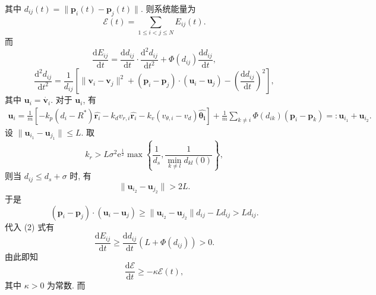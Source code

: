 \documentclass[12pt, a4paper, oneside]{ctexart}
\begin{document}
其中 $d_{ij}(t)=\|\boldsymbol{p}_i(t)-\boldsymbol{p}_j(t)\|.$ 则系统能量为
\begin{equation*}
	\mathcal{E}(t)=\sum_{1\leqslant i<j\leqslant N}E_{ij}(t).
\end{equation*}
而
\begin{equation*}
	\frac{\mathrm{d}E_{ij}}{\mathrm{d}t}=\frac{\mathrm{d}d_{ij}}{\mathrm{d}t}\cdot\frac{\mathrm{d}^2d_{ij}}{\mathrm{d}t^2}+\mathit{\Phi}(d_{ij})\frac{\mathrm{d}d_{ij}}{\mathrm{d}t},
\end{equation*}
\begin{equation}
	\frac{\mathrm{d}^2d_{ij}}{\mathrm{d}t^2}=\frac{1}{d_{ij}}\left[\|\boldsymbol{v}_i-\boldsymbol{v}_j\|^2+(\boldsymbol{p}_i-\boldsymbol{p}_j)\cdot(\boldsymbol{u}_i-\boldsymbol{u}_j)-\left(\frac{\mathrm{d}d_{ij}}{\mathrm{d}t}\right)^2\right],
\end{equation}
其中 $\boldsymbol{u}_i=\dot{\boldsymbol{v}_i}.$ 对于 $\boldsymbol{u}_i$, 有
\begin{align*}
	\boldsymbol{u}_i=\frac{1}{m}[-k_p(d_i-R^*)\widehat{\boldsymbol{r}_i}-k_dv_{r,i}\widehat{\boldsymbol{r}_i}-k_v(v_{\theta,i}-v_d)\hat{\boldsymbol{\theta_i}}]+\frac{1}{m}\sum_{k\ne i}\mathit{\Phi}(d_{ik})(\boldsymbol{p}_i-\boldsymbol{p}_k)=:\boldsymbol{u}_{i_1}+\boldsymbol{u}_{i_2}.
\end{align*}
设 $\|\boldsymbol{u}_{i_1}-\boldsymbol{u}_{j_1}\|\leqslant L.$ 取
\begin{equation*}
	k_r>L\sigma^2\mathrm{e}^{\frac{1}{2}}\max\left\{\frac{1}{d_s},\frac{1}{\displaystyle\min_{k\ne l}d_{kl}(0)}\right\},
\end{equation*}
则当 $d_{ij}\leqslant d_s+\sigma$ 时, 有
\begin{equation*}
	\|\boldsymbol{u}_{i_2}-\boldsymbol{u}_{j_2}\|>2L.
\end{equation*}
于是
\begin{equation*}
	(\boldsymbol{p}_i-\boldsymbol{p}_j)\cdot(\boldsymbol{u}_i-\boldsymbol{u}_j)\geqslant\|\boldsymbol{u}_{i_2}-\boldsymbol{u}_{j_2}\|d_{ij}-Ld_{ij}>Ld_{ij}.
\end{equation*}
代入 (2) 式有
\begin{equation*}
	\frac{\mathrm{d}E_{ij}}{\mathrm{d}t}\geqslant\frac{\mathrm{d}d_{ij}}{\mathrm{d}t}(L+\mathit{\Phi}(d_{ij}))>0.
\end{equation*}
由此即知
\begin{equation*}
	\frac{\mathrm{d}\mathcal{E}}{\mathrm{d}t}\geqslant-\kappa\mathcal{E}(t),
\end{equation*}
其中 $\kappa>0$ 为常数. 而
\end{document}
